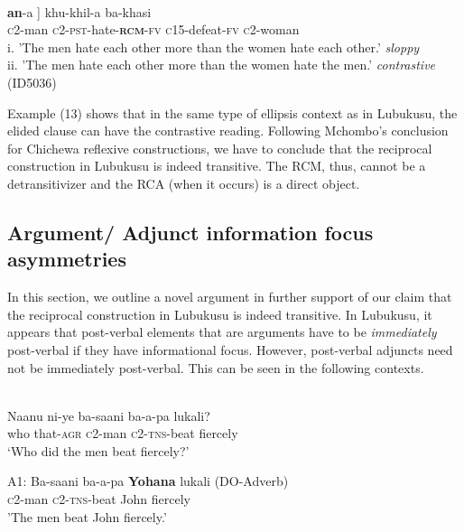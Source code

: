 \documentclass[output=paper]{langsci/langscibook}
\begin{document}
\ea\label{ex:}
\\
\gll {[ba-saani   ba-a-biyil-}\textbf{{an}}{-a ]   khu-khil-a   ba-khasi} \\
\textsc{c}2-man   \textsc{c2-pst}-hate-\textbf{\textsc{rcm}}\textsc{-fv}   \textsc{c}15-defeat-\textsc{fv}   \textsc{c}2-woman  \\
\glt i. 'The men hate each other more than the women hate each other.'  \textit{sloppy} \\
\glt ii. 'The men hate each other more than the women hate the men.'  \textit{contrastive}                       (ID5036)\\
\z

Example (13) shows that in the same type of ellipsis context as in Lubukusu, the elided clause can have the contrastive reading. Following Mchombo's conclusion for Chichewa reflexive constructions, we have to conclude that the reciprocal construction in Lubukusu is indeed transitive. The RCM, thus, cannot be a detransitivizer and the RCA (when it occurs) is a direct object.

\subsection{Argument/ Adjunct information focus asymmetries}

  In this section, we outline a novel argument in further support of our claim that the reciprocal construction in Lubukusu is indeed transitive. In Lubukusu, it appears that post-verbal elements that are arguments have to be \textit{immediately} post-verbal if they have informational focus. However, post-verbal adjuncts need not be immediately post-verbal. This can be seen in the following contexts.



\ea\label{ex:}
  \\
\gll Naanu  ni-ye    ba-saani   ba-a-pa   lukali? \\
who  that-\textsc{agr}   \textsc{c}2-man   \textsc{c}2-\textsc{tns}-beat   fiercely \\
\glt ‘Who did the men beat fiercely?’ \\
\z


\ea\label{ex:}
\gll A1:  Ba-saani  ba-a-pa  \textbf{{Yohana}}{  lukali}     (DO-Adverb) \\
       \textsc{c}2-man   \textsc{c2-tns}-beat   John     fiercely\\
\glt    'The men beat John fiercely.'
\end{document}
